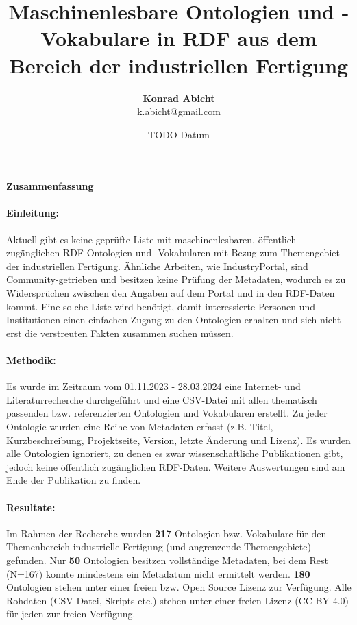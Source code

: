 \documentclass{article}
\title{Maschinenlesbare Ontologien und -Vokabulare in RDF aus dem Bereich der industriellen Fertigung}
\author{\textbf{Konrad Abicht} \\ k.abicht@gmail.com}
\date{TODO Datum}
\begin{document}
\maketitle

\paragraph{{\large Zusammenfassung}}

\paragraph{Einleitung:} Aktuell gibt es keine geprüfte Liste mit maschinenlesbaren, öffentlich-zugänglichen RDF-Ontologien und -Vokabularen mit Bezug zum Themengebiet der industriellen Fertigung.
Ähnliche Arbeiten, wie IndustryPortal, sind Community-getrieben und besitzen keine Prüfung der Metadaten, wodurch es zu Widersprüchen zwischen den Angaben auf dem Portal und in den RDF-Daten kommt.
Eine solche Liste wird benötigt, damit interessierte Personen und Institutionen einen einfachen Zugang zu den Ontologien erhalten und sich nicht erst die verstreuten Fakten zusammen suchen müssen.

\paragraph{Methodik:} Es wurde im Zeitraum vom 01.11.2023 - 28.03.2024 eine Internet- und Literaturrecherche durchgeführt und eine CSV-Datei mit allen thematisch passenden bzw. referenzierten Ontologien und Vokabularen erstellt.
Zu jeder Ontologie wurden eine Reihe von Metadaten erfasst (z.B. Titel, Kurzbeschreibung, Projektseite, Version, letzte Änderung und Lizenz).
Es wurden alle Ontologien ignoriert, zu denen es zwar wissenschaftliche Publikationen gibt, jedoch keine öffentlich zugänglichen RDF-Daten. Weitere Auswertungen sind am Ende der Publikation zu finden.

\paragraph{Resultate:} Im Rahmen der Recherche wurden \textbf{217} Ontologien bzw. Vokabulare für den Themenbereich industrielle Fertigung (und angrenzende Themengebiete) gefunden.
Nur \textbf{50} Ontologien besitzen vollständige Metadaten, bei dem Rest (N=167) konnte mindestens ein Metadatum nicht ermittelt werden.
\textbf{180} Ontologien stehen unter einer freien bzw. Open Source Lizenz zur Verfügung.
Alle Rohdaten (CSV-Datei, Skripts etc.) stehen unter einer freien Lizenz (CC-BY 4.0) für jeden zur freien Verfügung.
\end{document}
